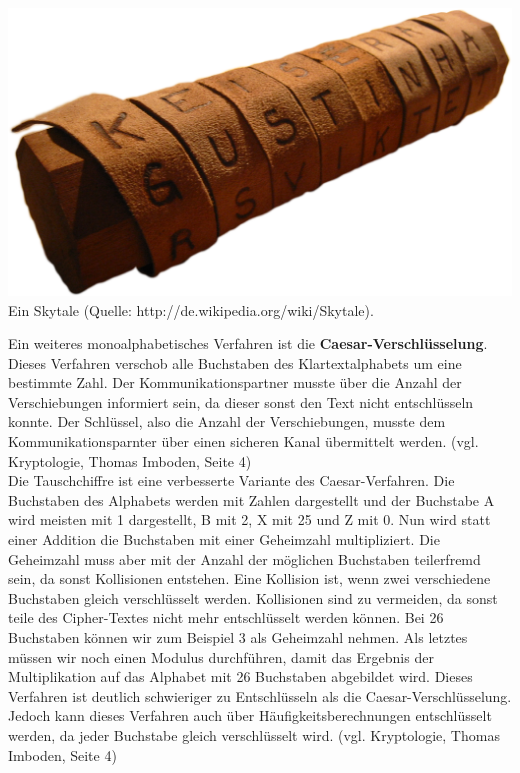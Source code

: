 \documentclass[12pt,a4paper]{report}
\begin{document}
\begin{center}
\includegraphics[scale=0.3]{img/krypto_skytale.png}\\
Ein Skytale (Quelle: http://de.wikipedia.org/wiki/Skytale).
\end{center}

Ein weiteres monoalphabetisches Verfahren ist die \textbf{Caesar-Verschlüsselung}. Dieses Verfahren verschob alle Buchstaben des Klartextalphabets um eine bestimmte Zahl. Der Kommunikationspartner musste über die Anzahl der Verschiebungen informiert sein, da dieser sonst den Text nicht entschlüsseln konnte. Der Schlüssel, also die Anzahl der Verschiebungen, musste dem Kommunikationsparnter über einen sicheren Kanal übermittelt werden. (vgl. Kryptologie, Thomas Imboden, Seite 4)\\

Die Tauschchiffre ist eine verbesserte Variante des Caesar-Verfahren. Die Buchstaben des Alphabets werden mit Zahlen dargestellt und der Buchstabe A wird meisten mit 1 dargestellt, B mit 2, X mit 25 und Z mit 0. Nun wird statt einer Addition die Buchstaben mit einer Geheimzahl multipliziert. Die Geheimzahl muss aber mit der Anzahl der möglichen Buchstaben teilerfremd sein, da sonst Kollisionen entstehen. Eine Kollision ist, wenn zwei verschiedene Buchstaben gleich verschlüsselt werden. Kollisionen sind zu vermeiden, da sonst teile des Cipher-Textes nicht mehr entschlüsselt werden können. Bei 26 Buchstaben können wir zum Beispiel 3 als Geheimzahl nehmen. Als letztes müssen wir noch einen Modulus durchführen, damit das Ergebnis der Multiplikation auf das Alphabet mit 26 Buchstaben abgebildet wird. Dieses Verfahren ist deutlich schwieriger zu Entschlüsseln als die Caesar-Verschlüsselung. Jedoch kann dieses Verfahren auch über Häufigkeitsberechnungen entschlüsselt werden, da jeder Buchstabe gleich verschlüsselt wird.  (vgl. Kryptologie, Thomas Imboden, Seite 4)\\
\end{document}
